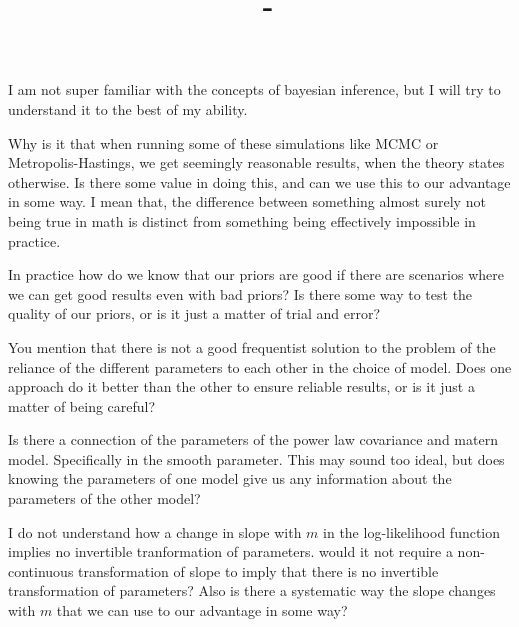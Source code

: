 \documentclass[answers,12pt,addpoints]{exam}
\author{\name}
\title{\course \ - \assignment}
\begin{document}
\maketitle

\newpage
\begin{questions}
\question I am not super familiar with the concepts of bayesian inference, but I will try to understand it to the best of my ability. 

\question Why is it that when running some of these simulations like MCMC or Metropolis-Hastings, we get seemingly reasonable results, when the theory states otherwise. Is there some value in doing this, and can we use this to our advantage in some way. I mean that, the difference between something almost surely not being true in math is distinct from something being effectively impossible in practice.

\question In practice how do we know that our priors are good if there are scenarios where we can get good results even with bad priors? Is there some way to test the quality of our priors, or is it just a matter of trial and error?

\question You mention that there is not a good frequentist solution to the problem of the reliance of the different parameters to each other in the choice of model. Does one approach do it better than the other to ensure reliable results, or is it just a matter of being careful?

\question Is there a connection of the parameters of the power law covariance and matern model. Specifically in the smooth parameter. This may sound too ideal, but does knowing the parameters of one model give us any information about the parameters of the other model?

\question I do not understand how a change in slope with $m$ in the log-likelihood function implies no invertible tranformation of parameters. would it not require a non-continuous transformation of slope to imply that there is no invertible transformation of parameters? Also is there a systematic way the slope changes with $m$ that we can use to our advantage in some way?

\end{questions}
\end{document}
